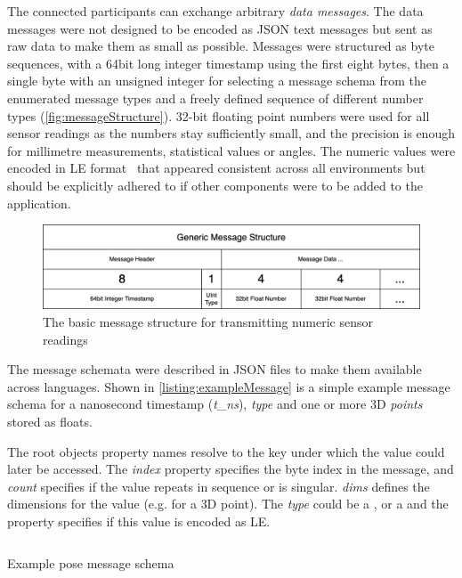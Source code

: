 The connected participants can exchange arbitrary \emph{data messages}.
The data messages were not designed to be encoded as \ac{JSON} text messages but sent as raw data to make them as small as possible.
Messages were structured as byte sequences, with a 64bit long integer timestamp using the first eight bytes, then a single byte with an unsigned integer for selecting a message schema from the enumerated message types and a freely defined sequence of different number types (\autoref{fig:messageStructure}).
32-bit floating point numbers were used for all sensor readings as the numbers stay sufficiently small, and the precision is enough for millimetre measurements, statistical values or angles.
The numeric values were encoded in \ac{LE} format~\parencite{cohenEndianess} that appeared consistent across all environments but should be explicitly adhered to if other components were to be added to the application.

\begin{figure}[h]
\centering
\includegraphics[width=\textwidth]{04_Artefakte/01_Abbildungen/generic-message-structure}
\caption[Generic Message Structure]{The basic message structure for transmitting numeric sensor readings\protect}
\label{fig:messageStructure}
\end{figure}

The message schemata were described in \ac{JSON} files to make them available across languages.
Shown in \autoref{listing:exampleMessage} is a simple example message schema for a nanosecond timestamp (\emph{{t\_ns}}), \emph{type} and one or more \ac{3D} \emph{points} stored as floats.

The root object\textquotesingle s property names resolve to the key under which the value could later be accessed.
The \emph{index} property specifies the byte index in the message, and \emph{count} specifies if the value repeats in sequence or is singular. \emph{dims} defines the dimensions for the value (e.g.  for a \ac{3D} point).
The \emph{type} could be a ,  or a  and the property  specifies if this value is encoded as \ac{LE}.

\begin{listing}[!ht]
\inputminted{json}{04_Artefakte/03_Listings/example-pose-message.json}
\caption{Example pose message schema}
\label{listing:exampleMessage}
\end{listing}

